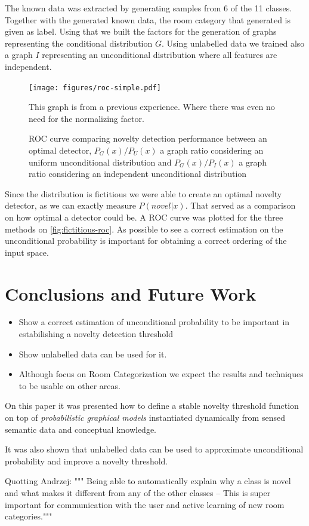 \documentclass[runningheads,a4paper]{llncs}
\begin{document}
The known data was extracted by generating samples from 6 of the 11 classes. Together with the generated known data, the
room category that generated is given as label. Using that we built the factors for the generation of graphs representing
the conditional distribution $G$.
Using unlabelled data we trained also a graph $I$ representing an unconditional distribution where all features are independent.

\begin{figure}[h!]
\centering
\texttt{[image: figures/roc-simple.pdf]}

This graph is from a previous experience. Where there was even no need for the normalizing factor.

\caption{\label{fig:fictitious-roc}ROC curve comparing novelty detection performance between an optimal detector,
         $P_G(x)/P_U(x)$ a graph ratio considering an uniform unconditional distribution and
         $P_G(x)/P_I(x)$ a graph ratio considering an independent unconditional distribution}
\end{figure}

Since the distribution is fictitious we were able to create an optimal novelty detector, as we can exactly measure $P(novel|x)$.
That served as a comparison on how optimal a detector could be.
A ROC curve was plotted for the three methods on \autoref{fig:fictitious-roc}.
As possible to see a correct estimation on the unconditional probability is important for obtaining a correct ordering of the
input space.






\section{Conclusions and Future Work}
\begin{itemize}
\item Show a correct estimation of unconditional probability to be important in estabilishing a novelty detection threshold
\item Show unlabelled data can be used for it.
\item Although focus on Room Categorization we expect the results and techniques to be usable on other areas.
\end{itemize}

On this paper it was presented how to define a stable novelty threshold function on top of
\emph{probabilistic graphical models} instantiated dynamically from sensed semantic data and
conceptual knowledge.

It was also shown that unlabelled data can be used to approximate unconditional probability and
improve a novelty threshold.



Quotting Andrzej: """ Being able to automatically explain why a class is novel and what
makes it different from any of the other classes -- This is super important for communication with the user and active learning of new room categories."""




\end{document}
